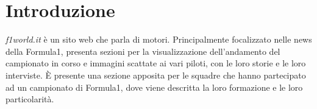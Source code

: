 \section{Introduzione}

\textit{f1world.it} \`e un sito web che parla di motori. Principalmente
focalizzato nelle news della Formula1, presenta sezioni per la
visualizzazione dell'andamento del campionato in corso e immagini scattate ai
vari piloti, con le loro storie e le loro interviste. È presente una
sezione apposita per le squadre che hanno partecipato ad un campionato di
Formula1, dove viene descritta la loro formazione e le loro particolarit\`a.

